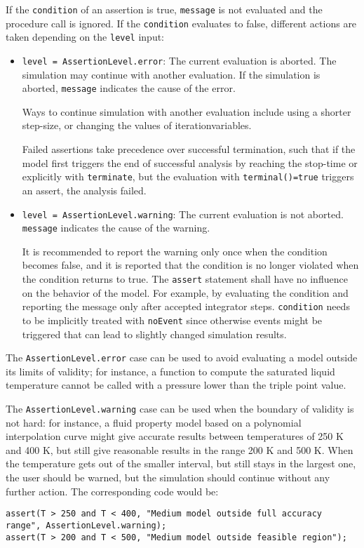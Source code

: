 If the \lstinline!condition! of an assertion is true, \lstinline!message! is not evaluated and the procedure call is ignored.
If the \lstinline!condition! evaluates to false, different actions are taken depending on the \lstinline!level! input:
\begin{itemize}
\item
  \lstinline!level = AssertionLevel.error!:
  The current evaluation is aborted.
  The simulation may continue with another evaluation.
  If the simulation is aborted, \lstinline!message! indicates the cause of the error.
  \begin{nonnormative}
  Ways to continue simulation with another evaluation include using a shorter step-size, or changing the values of iterationvariables.
  \end{nonnormative}
  Failed assertions take precedence over successful termination, such that if the model first triggers the end of successful analysis by reaching the stop-time or explicitly with \lstinline!terminate!, but the evaluation with \lstinline!terminal()=true! triggers an assert, the analysis failed.
\item
  \lstinline!level = AssertionLevel.warning!:
  The current evaluation is not aborted.
  \lstinline!message! indicates the cause of the warning.
  \begin{nonnormative}
  It is recommended to report the warning only once when the condition becomes false, and it is reported that the condition is no longer violated when the condition returns to true.
  The \lstinline!assert! statement shall have no influence on the behavior of the model.
  For example, by evaluating the condition and reporting the message only after accepted integrator steps.
  \lstinline!condition! needs to be implicitly treated with \lstinline!noEvent! since otherwise events might be triggered that can lead to slightly changed simulation results.
  \end{nonnormative}
\end{itemize}

\begin{nonnormative}
The \lstinline!AssertionLevel.error! case can be used to avoid evaluating a
model outside its limits of validity; for instance, a function to
compute the saturated liquid temperature cannot be called with a
pressure lower than the triple point value.

The \lstinline!AssertionLevel.warning! case can be used when the boundary of
validity is not hard: for instance, a fluid property model based on a
polynomial interpolation curve might give accurate results between
temperatures of 250 K and 400 K, but still give reasonable results in
the range 200 K and 500 K. When the temperature gets out of the smaller
interval, but still stays in the largest one, the user should be warned,
but the simulation should continue without any further action. The
corresponding code would be:
\begin{lstlisting}[language=modelica]
assert(T > 250 and T < 400, "Medium model outside full accuracy range", AssertionLevel.warning);
assert(T > 200 and T < 500, "Medium model outside feasible region");
\end{lstlisting}
\end{nonnormative}


